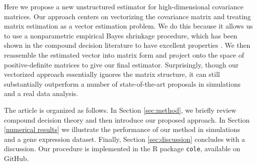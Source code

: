 
Here we propose a new unstructured estimator for high-dimensional covariance matrices. Our approach centers on vectorizing the covariance matrix and treating matrix estimation as a vector estimation problem. We do this because it allows us to use a nonparametric empirical Bayes shrinkage procedure, which has been shown in the compound decision literature to have excellent properties \citep{jiang2009general, koenker2014convex}. We then reassemble the estimated vector into matrix form and project onto the space of positive-definite matrices to give our final estimator. Surprisingly, though our vectorized approach essentially ignores the matrix structure, it can still substantially outperform a number of state-of-the-art proposals in simulations and a real data analysis.

The article is organized as follows. In Section \ref{sec:method}, we briefly review compound decision theory and then introduce our proposed approach. In Section \ref{numerical results} we illustrate the performance of our method in simulations and a gene expression dataset. Finally, Section \ref{sec:discussion} concludes with a discussion. Our procedure is implemented in the R package \verb|cole|, available on GitHub.

